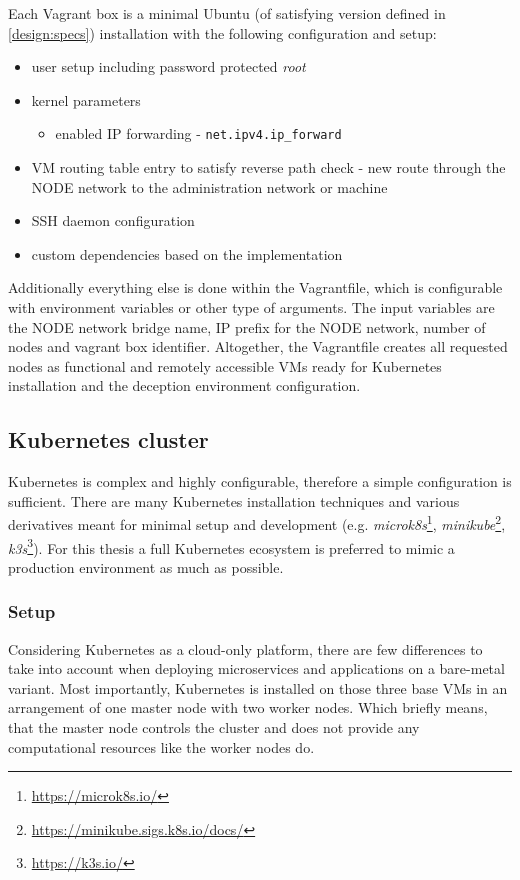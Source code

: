 Each Vagrant box is a minimal Ubuntu (of satisfying version defined in \autoref{design:specs}) installation with the following configuration and setup:
\begin{itemize}[noitemsep]
	\item 
	user setup including password protected \textit{root}
	\item 
	kernel parameters
	\begin{itemize}[noitemsep, label=$\hyphen$]
		\item
		enabled IP forwarding - \texttt{net.ipv4.ip\_forward}
	\end{itemize}
	\item 
	VM routing table entry to satisfy reverse path check - new route through the NODE network to the administration network or machine
	\item
	SSH daemon configuration
	\item 
	custom dependencies based on the implementation
\end{itemize}

Additionally everything else is done within the Vagrantfile, which is configurable with environment variables or other type of arguments. The input variables are the NODE network bridge name, IP prefix for the NODE network, number of nodes and vagrant box identifier. Altogether, the Vagrantfile creates all requested nodes as functional and remotely accessible VMs ready for Kubernetes installation and the deception environment configuration.

\subsection{Kubernetes cluster \label{design:env-arch:k8s}}
Kubernetes is complex and highly configurable, therefore a simple configuration is sufficient. There are many Kubernetes installation techniques and various derivatives meant for minimal setup and development (e.g. \textit{microk8s}\footnote{\url{https://microk8s.io/}}, \textit{minikube}\footnote{\url{https://minikube.sigs.k8s.io/docs/}}, \textit{k3s}\footnote{\url{https://k3s.io/}}). For this thesis a full Kubernetes ecosystem is preferred to mimic a production environment as much as possible.

\subsubsection*{Setup \label{design:env-arch:k8s:setup}}
Considering Kubernetes as a cloud-only platform, there are few differences to take into account when deploying microservices and applications on a bare-metal variant. Most importantly, Kubernetes is installed on those three base VMs in an arrangement of one master node with two worker nodes. Which briefly means, that the master node controls the cluster and does not provide any computational resources like the worker nodes do.


